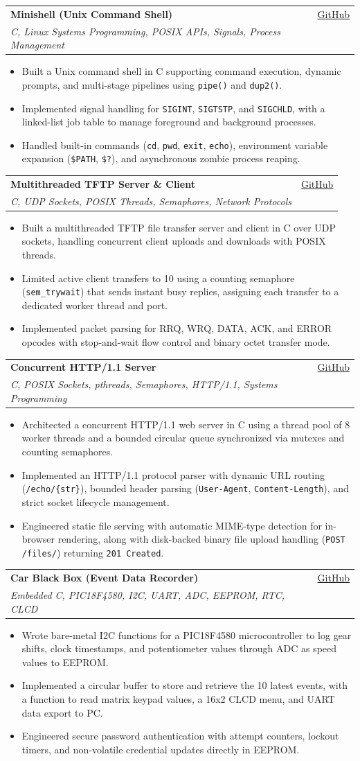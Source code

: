 \documentclass[letterpaper,11pt]{article}
\makeatletter
\newcommand{\resumeItem}[1]{
  \item
    {#1 \vspace{-3pt}}
}
\newcommand{\resumeSubheading}[4]{
  \vspace{-2pt}\item
    \begin{tabular*}{0.97\textwidth}[t]{l@{\extracolsep{\fill}}r}
      \textbf{#1} & #2 \\
      \textit{#3} & {#4} \\
    \end{tabular*}\vspace{-7pt}
}
\newcommand{\resumeItemListStart}{\begin{itemize}[topsep=2pt, itemsep=1pt, parsep=0pt]}
\newcommand{\resumeItemListEnd}{\end{itemize}\vspace{-6pt}}
\makeatother
\begin{document}
    \resumeSubheading
      {Minishell (Unix Command Shell)}{\href{https://github.com/k0-R0/Minishell}{GitHub}}
      {C, Linux Systems Programming, POSIX APIs, Signals, Process Management}{}
      \resumeItemListStart
        \resumeItem{Built a Unix command shell in C supporting command execution, dynamic prompts, and multi-stage pipelines using \texttt{pipe()} and \texttt{dup2()}.}
        \resumeItem{Implemented signal handling for \texttt{SIGINT}, \texttt{SIGTSTP}, and \texttt{SIGCHLD}, with a linked-list job table to manage foreground and background processes.}
        \resumeItem{Handled built-in commands (\texttt{cd}, \texttt{pwd}, \texttt{exit}, \texttt{echo}), environment variable expansion (\texttt{\$PATH}, \texttt{\$?}), and asynchronous zombie process reaping.}
      \resumeItemListEnd

    \resumeSubheading
      {Multithreaded TFTP Server \& Client}{\href{https://github.com/k0-R0/TFTP}{GitHub}}
      {C, UDP Sockets, POSIX Threads, Semaphores, Network Protocols}{}
      \resumeItemListStart
        \resumeItem{Built a multithreaded TFTP file transfer server and client in C over UDP sockets, handling concurrent client uploads and downloads with POSIX threads.}
        \resumeItem{Limited active client transfers to 10 using a counting semaphore (\texttt{sem\_trywait}) that sends instant busy replies, assigning each transfer to a dedicated worker thread and port.}
        \resumeItem{Implemented packet parsing for RRQ, WRQ, DATA, ACK, and ERROR opcodes with stop-and-wait flow control and binary octet transfer mode.}
      \resumeItemListEnd

    \resumeSubheading
      {Concurrent HTTP/1.1 Server}{\href{https://github.com/k0-R0/HTTP_Server}{GitHub}}
      {C, POSIX Sockets, pthreads, Semaphores, HTTP/1.1, Systems Programming}{}
      \resumeItemListStart
        \resumeItem{Architected a concurrent HTTP/1.1 web server in C using a thread pool of 8 worker threads and a bounded circular queue synchronized via mutexes and counting semaphores.}
        \resumeItem{Implemented an HTTP/1.1 protocol parser with dynamic URL routing (\texttt{/echo/\{str\}}), bounded header parsing (\texttt{User-Agent}, \texttt{Content-Length}), and strict socket lifecycle management.}
        \resumeItem{Engineered static file serving with automatic MIME-type detection for in-browser rendering, along with disk-backed binary file upload handling (\texttt{POST /files/}) returning \texttt{201 Created}.}
      \resumeItemListEnd

    \resumeSubheading
      {Car Black Box (Event Data Recorder)}{\href{https://github.com/k0-R0/car_blackbox}{GitHub}}
      {Embedded C, PIC18F4580, I2C, UART, ADC, EEPROM, RTC, CLCD}{}
      \resumeItemListStart
        \resumeItem{Wrote bare-metal I2C functions for a PIC18F4580 microcontroller to log gear shifts, clock timestamps, and potentiometer values through ADC as speed values to EEPROM.}
        \resumeItem{Implemented a circular buffer to store and retrieve the 10 latest events, with a function to read matrix keypad values, a 16x2 CLCD menu, and UART data export to PC.}
        \resumeItem{Engineered secure password authentication with attempt counters, lockout timers, and non-volatile credential updates directly in EEPROM.}
      \resumeItemListEnd
\end{document}
